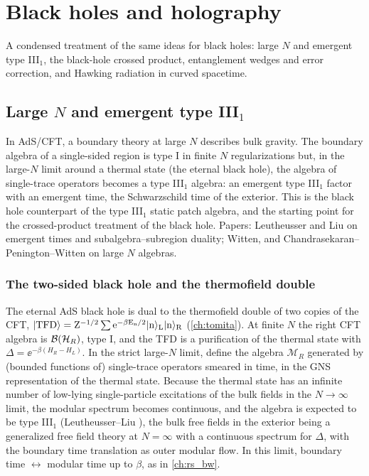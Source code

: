 \chapter{Black holes and holography}\label{ch:bh}

A condensed treatment of the same ideas for black holes: large $N$ and emergent type III$_1$, the black-hole crossed product, entanglement wedges and error correction, and Hawking radiation in curved spacetime.

\section{Large $N$ and emergent type III$_1$}\label{ch:large_N}
\skippable

\begin{physmotiv}
In AdS/CFT, a boundary theory at large $N$ describes bulk gravity. The boundary algebra of a single-sided region is type I in finite $N$ regularizations but, in the large-$N$ limit around a thermal state (the eternal black hole), the algebra of single-trace operators becomes a type III$_1$ algebra: an emergent type III$_1$ factor with an emergent time, the Schwarzschild time of the exterior. This is the black hole counterpart of the type III$_1$ static patch algebra, and the starting point for the crossed-product treatment of the black hole. Papers: Leutheusser and Liu on emergent times and subalgebra--subregion duality; Witten, and Chandrasekaran--Penington--Witten on large $N$ algebras.
\end{physmotiv}

\subsection{The two-sided black hole and the thermofield double}

The eternal AdS black hole is dual to the thermofield double of two copies of the CFT, $\lvert \rm TFD\rangle=Z^{-1/2}\sum\mathrm{e}^{-\beta E_n/2}\lvert n\rangle_L\lvert n\rangle_R$ (\cref{ch:tomita}). At finite $N$ the right CFT algebra is $\mathcal{B}(\mathcal{H}_R)$, type I, and the TFD is a purification of the thermal state with $\Delta=\ee^{-\beta(H_R-H_L)}$. In the strict large-$N$ limit, define the algebra $\mathcal M_R$ generated by (bounded functions of) single-trace operators smeared in time, in the GNS representation of the thermal state. Because the thermal state has an infinite number of low-lying single-particle excitations of the bulk fields in the $N\to\infty$ limit, the modular spectrum becomes continuous, and the algebra is expected to be type III$_1$ (Leutheusser--Liu \cite{LeutheusserLiu2022}), the bulk free fields in the exterior being a generalized free field theory at $N=\infty$ with a continuous spectrum for $\Delta$, with the boundary time translation as outer modular flow. In this limit, boundary time $\leftrightarrow$ modular time up to $\beta$, as in \cref{ch:rs_bw}.

